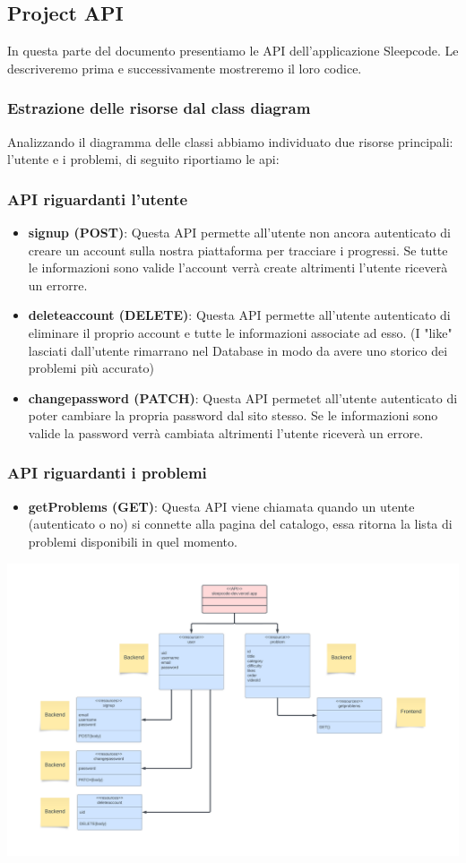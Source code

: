 \documentclass[11pt, a4paper]{article}
\theoremstyle{definition}
\begin{document}
\subsection{Project API}
In questa parte del documento presentiamo le API dell'applicazione Sleepcode.
Le descriveremo prima e successivamente mostreremo il loro codice.
\subsubsection{Estrazione delle risorse dal class diagram}
Analizzando il diagramma delle classi abbiamo individuato due risorse principali: l'utente e i problemi, di seguito riportiamo le api:
\subsubsection{API riguardanti l'utente}
\begin{itemize}
  \item \textbf{signup (POST)}: Questa API permette all'utente non ancora autenticato di creare un account sulla nostra piattaforma per tracciare i progressi. Se tutte le informazioni sono valide l'account verrà create altrimenti l'utente riceverà un errorre.
  \item \textbf{deleteaccount (DELETE)}: Questa API permette all'utente autenticato di eliminare il proprio account e tutte le informazioni associate ad esso. (I "like" lasciati dall'utente rimarrano nel Database in modo da avere uno storico dei problemi più accurato)
  \item \textbf{changepassword (PATCH)}: Questa API permetet all'utente autenticato di poter cambiare la propria password dal sito stesso. Se le informazioni sono valide la password verrà cambiata altrimenti l'utente riceverà un errore.
\end{itemize}

\subsubsection{API riguardanti i problemi}
\begin{itemize}
  \item \textbf{getProblems (GET)}: Questa API viene chiamata quando un utente (autenticato o no) si connette alla pagina del catalogo, essa ritorna la lista di problemi disponibili in quel momento.
\end{itemize}
\newpage
\includegraphics[width=\textwidth]{materiale/Resource diagram.png}
\end{document}
